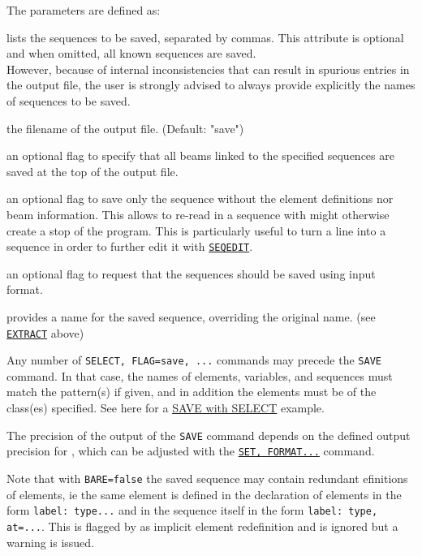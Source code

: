 The parameters are defined as: 
\begin{madlist}
	 lists the sequences to be saved, separated by commas. 
	This attribute is optional and when omitted, all known 
	sequences are saved. \\
	However, because of internal inconsistencies that can result in spurious 
	entries in the output file, the user is strongly advised to always provide 
	explicitly the names of sequences to be saved.
	
	 the filename of the output file. (Default: "save")
	
	 an optional flag to specify that all beams linked to the
	specified sequences are saved at the top of the output file.
	
	 an optional flag to save only the sequence without the
	element definitions nor beam information. This allows to re-read in a
	sequence with might otherwise create a stop of the program. This is
	particularly useful to turn a line into a sequence in order to further edit 
	it with \hyperref[sec:seqedit]{\tt SEQEDIT}.
	
	 an optional flag to request that the sequences should be  
	saved using \madeight input format.  
	
	 provides a name for the saved sequence, overriding the 
	original name. (see \hyperref[sec:extract]{\tt EXTRACT} above)
\end{madlist}


Any number of {\tt SELECT, FLAG=save, ...} commands may precede
the {\tt SAVE} command. In that case, the names of elements, variables, and
sequences must match the pattern(s) if given, and in addition the
elements must be of the class(es) specified. 
See here for a
\href{../Introduction/select.html#save_select}{SAVE with SELECT}
example.  

The precision of the output of the {\tt SAVE} command depends on the defined 
output precision for \madx, which can be adjusted with the 
\hyperref[sec:set]{\tt SET, FORMAT...} command.

 

Note that with {\tt BARE=false} the saved sequence may contain redundant 
efinitions of elements, ie the same element is defined in the declaration 
of elements in the form {\tt label:\ type...} and in the sequence itself 
in the form {\tt label:\ type, at=...}. This is flagged by \madx as implicit 
element redefinition and is ignored but a warning is issued. 

